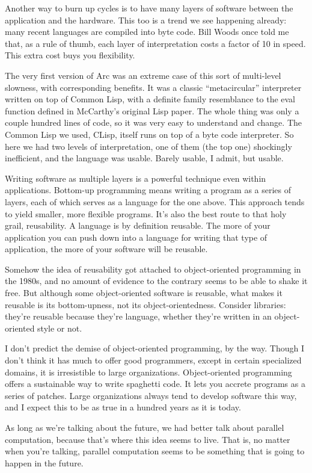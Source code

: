 Another way to burn up cycles is to have many layers of software between
the application and the hardware. This too is a trend we see happening
already: many recent languages are compiled into byte code. Bill Woods
once told me that, as a rule of thumb, each layer of interpretation
costs a factor of 10 in speed. This extra cost buys you flexibility.

The very first version of Arc was an extreme case of this sort of
multi-level slowness, with corresponding benefits. It was a classic
``metacircular'' interpreter written on top of Common Lisp, with a
definite family resemblance to the eval function defined in McCarthy's
original Lisp paper. The whole thing was only a couple hundred lines of
code, so it was very easy to understand and change. The Common Lisp we
used, CLisp, itself runs on top of a byte code interpreter. So here we
had two levels of interpretation, one of them (the top one) shockingly
inefficient, and the language was usable. Barely usable, I admit, but
usable.

Writing software as multiple layers is a powerful technique even within
applications. Bottom-up programming means writing a program as a series
of layers, each of which serves as a language for the one above. This
approach tends to yield smaller, more flexible programs. It's also the
best route to that holy grail, reusability. A language is by definition
reusable. The more of your application you can push down into a language
for writing that type of application, the more of your software will be
reusable.

Somehow the idea of reusability got attached to object-oriented
programming in the 1980s, and no amount of evidence to the contrary
seems to be able to shake it free. But although some object-oriented
software is reusable, what makes it reusable is its bottom-upness, not
its object-orientedness. Consider libraries: they're reusable because
they're language, whether they're written in an object-oriented style or
not.

I don't predict the demise of object-oriented programming, by the way.
Though I don't think it has much to offer good programmers, except in
certain specialized domains, it is irresistible to large organizations.
Object-oriented programming offers a sustainable way to write spaghetti
code. It lets you accrete programs as a series of patches. Large
organizations always tend to develop software this way, and I expect
this to be as true in a hundred years as it is today.

As long as we're talking about the future, we had better talk about
parallel computation, because that's where this idea seems to live. That
is, no matter when you're talking, parallel computation seems to be
something that is going to happen in the future.

